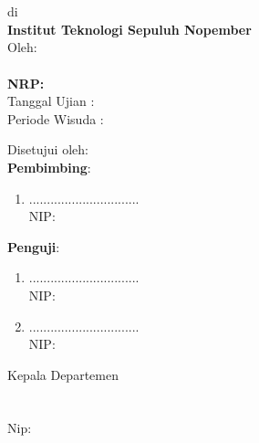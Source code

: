 
{ \AddToShipoutPicture*{\BackgroundIm}
\begin{center}

\Large\textbf{\pPengesahan}
\end{center}
\begin{center}
\tsss\\
\textbf{\ggGelar}\\
di\\
\textbf{Institut Teknologi Sepuluh Nopember}\\
\vspace{1ex}
Oleh:\\
\textbf{\NamaMahasiswa}\\ 
\textbf{NRP:\NrpMahasiswa}\\ 
\vspace{1ex}
Tanggal Ujian :\TglUjian\\
Periode Wisuda : \PerWisuda\\
\vspace{1ex}
\end{center}
\begin{center}
Disetujui oleh:\\
\textbf{Pembimbing}:
\end{center}
\begin{enumerate}
\item \PbSatu \hfill ...............................\\
NIP:\NipPbSatu \vfill
{}\vfill
{}
\end{enumerate}	
\begin{center}
	\textbf{Penguji}:
\end{center}
\begin{enumerate}
	\item \PjSatu \hfill ...............................\\
	NIP:\NipPjSatu
	\vfill
	\item \PjDua \hfill ...............................\\
	NIP:\NipPjDua\vfill
{}
\end{enumerate}	
\vfill
\begin{center}
	Kepala Departemen \Dep \\
	 \fak\\
	\vspace{9ex}
	\underline{\NmKaDep}\\
	Nip:\NipKaDep
\end{center}
\newpage
}
